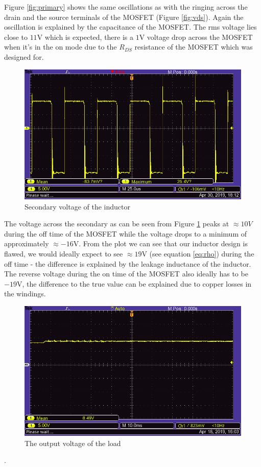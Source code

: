 \documentclass[a4paper, 12pt]{article}
\begin{document}
Figure \ref{fig:primary} shows the same oscillations as with the ringing across the drain and the source terminals of the MOSFET (Figure \ref{fig:vds}). Again the oscillation is explained by the capacitance of the MOSFET. The rms voltage lies close to $11$V which is expected, there is a $1$V voltage drop across the MOSFET when it's in the on mode due to the $R_{DS}$ resistance of the MOSFET which was designed for.  

\begin{figure}[H]
  \centering
  \includegraphics[width=\textwidth]{images/Secondary.png}
  \caption{Secondary voltage of the inductor}
  \label{fig:secondary}
\end{figure} 

The voltage across the secondary as can be seen from Figure \ref{fig:secondary} peaks at $\approx 10V$ during the off time of the MOSFET while the voltage drops to a minimum of approximately $\approx -16$V. From the plot we can see that our inductor design is flawed, we would ideally expect to see $\approx 19$V (see equation \eqref{eq:rho}) during the off time - the difference is explained by the leakage inductance of the inductor. The reverse voltage during the on time of the MOSFET also ideally has to be $-19$V, the difference to the true value can be explained due to copper losses in the windings.  


\begin{figure}[H]
  \centering
  \includegraphics[width=\textwidth]{images/output_from_load.png}
  \caption{The output voltage of the load}
  \label{fig:output_from_load}
\end{figure}. 
\end{document}

